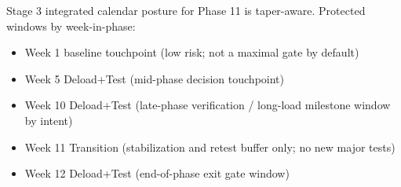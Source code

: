 \documentclass[10pt]{article}
\begin{document}
\begin{landscape}
Stage 3 integrated calendar posture for Phase 11 is taper-aware. Protected windows by week-in-phase:

\begin{itemize}
\item Week 1 baseline touchpoint (low risk; not a maximal gate by default)
\item Week 5 Deload+Test (mid-phase decision touchpoint)
\item Week 10 Deload+Test (late-phase verification / long-load milestone window by intent)
\item Week 11 Transition (stabilization and retest buffer only; no new major tests)
\item Week 12 Deload+Test (end-of-phase exit gate window)
\end{itemize}

\end{landscape}
\clearpage
\end{document}
